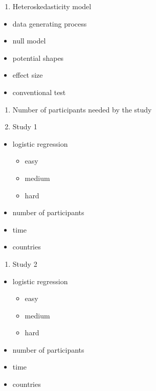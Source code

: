 \documentclass{monashthesis}
\theoremstyle{definition}
\theoremstyle{definition}
\theoremstyle{definition}
\theoremstyle{definition}
\theoremstyle{remark}
\begin{document}
\begin{enumerate}
\def\labelenumi{\arabic{enumi}.}
\setcounter{enumi}{3}
\tightlist
\item
  Heteroskedasticity model
\end{enumerate}

\begin{itemize}
\tightlist
\item
  data generating process
\item
  null model
\item
  potential shapes
\item
  effect size
\item
  conventional test
\end{itemize}

\begin{enumerate}
\def\labelenumi{\arabic{enumi}.}
\setcounter{enumi}{3}
\tightlist
\item
  Number of participants needed by the study
\item
  Study 1
\end{enumerate}

\begin{itemize}
\tightlist
\item
  logistic regression

  \begin{itemize}
  \tightlist
  \item
    easy
  \item
    medium
  \item
    hard
  \end{itemize}
\item
  number of participants
\item
  time
\item
  countries
\end{itemize}

\begin{enumerate}
\def\labelenumi{\arabic{enumi}.}
\setcounter{enumi}{3}
\tightlist
\item
  Study 2
\end{enumerate}

\begin{itemize}
\tightlist
\item
  logistic regression

  \begin{itemize}
  \tightlist
  \item
    easy
  \item
    medium
  \item
    hard
  \end{itemize}
\item
  number of participants
\item
  time
\item
  countries
\end{itemize}
\end{document}
